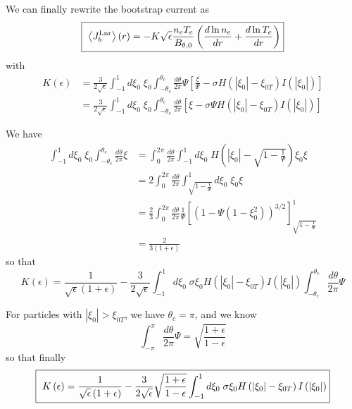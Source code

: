 We can finally rewrite the bootstrap current as%
\begin{equation}
\fbox{ $\displaystyle \left\langle J_{b}^{\text{Lnr}}\right\rangle
\left(  r\right)  =-K\sqrt
{\epsilon}\frac{n_{e}T_{e}}{B_{\theta,0}}\left(  \frac{d\ln n_{e}}{dr}%
+\frac{d\ln T_{e}}{dr}\right) $}
\end{equation}
with%
\begin{align}
K\left(  \epsilon\right)   &  =\frac{3}{2\sqrt{\epsilon}}\int_{-1}^{1}d\xi
_{0}\;\xi_{0}\int_{-\theta_{c}}^{\theta_{c}}\frac{d\theta}{2\pi}\Psi\left[
\frac{\xi}{\Psi}-\sigma H\left(  \left|  \xi_{0}\right|  -\xi_{0T}\right)
I\left(  \left|  \xi_{0}\right|  \right)  \right] \nonumber\\
&  =\frac{3}{2\sqrt{\epsilon}}\int_{-1}^{1}d\xi_{0}\;\xi_{0}\int_{-\theta_{c}%
}^{\theta_{c}}\frac{d\theta}{2\pi}\left[  \xi-\sigma\Psi H\left(  \left|
\xi_{0}\right|  -\xi_{0T}\right)  I\left(  \left|  \xi_{0}\right|  \right)
\right]
\end{align}

We have%
\begin{align}
\int_{-1}^{1}d\xi_{0}\;\xi_{0}\int_{-\theta_{c}}^{\theta_{c}}\frac{d\theta
}{2\pi}\xi &  =\int_{0}^{2\pi}\frac{d\theta}{2\pi}\int_{-1}^{1}d\xi
_{0}\;H\left(  \left|  \xi_{0}\right|  -\sqrt{1-\frac{1}{\Psi}}\right)
\xi_{0}\xi\nonumber\\
&  =2\int_{0}^{2\pi}\frac{d\theta}{2\pi}\int_{\sqrt{1-\frac{1}{\Psi}}}^{1}%
d\xi_{0}\;\xi_{0}\xi\nonumber\\
&  =\frac{2}{3}\int_{0}^{2\pi}\frac{d\theta}{2\pi}\frac{1}{\Psi}\left[
\left(  1-\Psi\left(  1-\xi_{0}^{2}\right)  \right)  ^{3/2}\right]
_{\sqrt{1-\frac{1}{\Psi}}}^{1}\nonumber\\
&  =\frac{2}{3\left(  1+\epsilon\right)  }%
\end{align}
so that
\begin{equation}
K\left(  \epsilon\right)  =\frac{1}{\sqrt{\epsilon}\left(  1+\epsilon\right)
}-\frac{3}{2\sqrt{\epsilon}}\int_{-1}^{1}d\xi_{0}\;\sigma\xi_{0}H\left(
\left|  \xi_{0}\right|  -\xi_{0T}\right)  I\left(  \left|  \xi_{0}\right|
\right)  \int_{-\theta_{c}}^{\theta_{c}}\frac{d\theta}{2\pi}\Psi
\end{equation}

For particles with $\left|  \xi_{0}\right|  >\xi_{0T}$, we have $\theta
_{c}=\pi$, and we know%
\begin{equation}
\int_{-\pi}^{\pi}\frac{d\theta}{2\pi}\Psi=\sqrt{\frac{1+\epsilon}{1-\epsilon}}%
\end{equation}
so that finally%
\begin{equation}
\fbox{ $\displaystyle K\left(  \epsilon\right)
=\frac{1}{\sqrt{\epsilon}\left(  1+\epsilon\right)
}-\frac{3}{2\sqrt{\epsilon}}\sqrt{\frac{1+\epsilon}{1-\epsilon}}\int_{-1}%
^{1}d\xi_{0}\;\sigma\xi_{0}H\left(  \left|  \xi_{0}\right|  -\xi_{0T}\right)
I\left(  \left|  \xi_{0}\right|  \right)$}  \label{k1}%
\end{equation}


